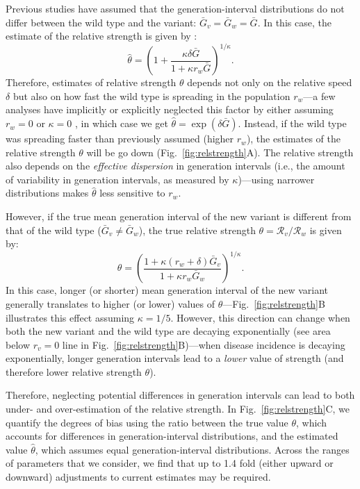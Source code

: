 \documentclass[12pt]{article}
\newcommand{\fref}[1]{Fig.~\ref{fig:#1}}
\newcommand{\RR}{\ensuremath{{\mathcal R}}\xspace}
\begin{document}
Previous studies have assumed that the generation-interval distributions do not differ between the wild type and the variant: $\bar{G}_v = \bar{G}_w = \bar{G}$.
In this case, the estimate of the relative strength is given by \citep{park2019practical}:
\begin{equation}
\hat{\theta} = \left(1 + \frac{\kappa \delta \bar{G}}{1 + \kappa r_w \bar{G}}\right)^{1/\kappa}.
\end{equation}
Therefore, estimates of relative strength $\theta$ depends not only on the relative speed $\delta$ but also on how fast the wild type is spreading in the population $r_w$---a few analyses have implicitly or explicitly neglected this factor by either assuming $r_w = 0$ \citep{switzerland2021variant} or $\kappa = 0$ \citep{davies2021estimated}, in which case we get $\hat{\theta} = \exp(\delta \bar{G})$.
Instead, if the wild type was spreading faster than previously assumed (higher $r_w$), the estimates of the relative strength $\theta$ will be go down (\fref{relstrength}A).
The relative strength also depends on the \emph{effective dispersion} in generation intervals (i.e., the amount of variability in generation intervals, as measured by $\kappa$)---using narrower distributions makes $\hat{\theta}$ less sensitive to $r_w$.

However, if the true mean generation interval of the new variant is different from that of the wild type ($\bar{G}_v \neq \bar{G}_w$), the true relative strength $\theta = \RR_v/\RR_w$ is given by:
\begin{equation}
\theta = \left(\frac{1 + \kappa (r_w + \delta) \bar{G}_v}{1 + \kappa r_w \bar{G}_w}\right)^{1/\kappa}.
\end{equation}
In this case, longer (or shorter) mean generation interval of the new variant generally translates to higher (or lower) values of $\theta$---\fref{relstrength}B illustrates this effect assuming $\kappa = 1/5$.
However, this direction can change when both the new variant and the wild type are decaying exponentially (see area below $r_v = 0$ line in \fref{relstrength}B)---when disease incidence is decaying exponentially, longer generation intervals lead to a \emph{lower} value of strength (and therefore lower relative strength $\theta$).

Therefore, neglecting potential differences in generation intervals can lead to both under- and over-estimation of the relative strength.
In \fref{relstrength}C, we quantify the degrees of bias using the ratio between the true value $\theta$, which accounts for differences in generation-interval distributions, and the estimated value $\hat{\theta}$, which assumes equal generation-interval distributions.
Across the ranges of parameters that we consider, we find that up to 1.4 fold (either upward or downward) adjustments to current estimates may be required.
\end{document}
